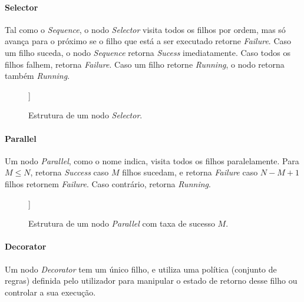 \paragraph{Selector}{
    Tal como o \textit{Sequence}, o nodo \textit{Selector} visita todos os filhos por ordem, mas só avança para o próximo se o filho que está a ser executado retorne \textit{Failure}.
    Caso um filho suceda, o nodo \textit{Sequence} retorna \textit{Sucess} imediatamente.
    Caso todos os filhos falhem, retorna \textit{Failure}.
    Caso um filho retorne \textit{Running}, o nodo retorna também \textit{Running}.

    \begin{figure}[H]
    \centering
    \begin{behavior}
        [\selector
            [\action{Child 1}]
            [\action{Child 2}]
            [{\textbf{. . .}}, inner sep=10pt]
            [\action{Child N}]
        ]
    \end{behavior}
    \caption{Estrutura de um nodo \textit{Selector}.}
    \label{fig:2.3}
    \end{figure}
}

\paragraph{Parallel}{
    Um nodo \textit{Parallel}, como o nome indica, visita todos os filhos paralelamente.
    Para $M \leq N$, retorna \textit{Success} caso $M$ filhos sucedam, e retorna \textit{Failure} caso $N - M + 1$ filhos retornem \textit{Failure}.
    Caso contrário, retorna \textit{Running}.

    \begin{figure}[H]
    \centering
    \begin{behavior}
        [\parallel{M}
            [\action{Child 1}]
            [\action{Child 2}]
            [{\textbf{. . .}}, inner sep=10pt]
            [\action{Child N}]
        ]
    \end{behavior}
    \caption{Estrutura de um nodo \textit{Parallel} com taxa de sucesso $M$.}
    \label{fig:2.4}
    \end{figure}
}

\paragraph{Decorator}
    Um nodo \textit{Decorator} tem um único filho, e utiliza uma política (conjunto de regras) definida pelo utilizador para manipular o estado de retorno desse filho ou controlar a sua execução.

